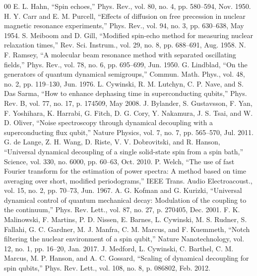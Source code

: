 \documentclass[conference]{IEEEtran}
\begin{document}
\begin{thebibliography}{00}
 E. L. Hahn, ``Spin echoes,'' Phys. Rev., vol. 80, no. 4,
pp. 580--594, Nov. 1950.
 H. Y. Carr and E. M. Purcell, ``Effects of diffusion on free
precession in nuclear magnetic resonance experiments,'' Phys. Rev., vol. 94,
no. 3, pp. 630--638, May 1954.
 S. Meiboom and D. Gill, ``Modified spin-echo method for measuring
nuclear relaxation times,'' Rev. Sci. Instrum., vol. 29, no. 8, pp. 688--691,
Aug. 1958.
 N. F. Ramsey, ``A molecular beam resonance method with separated
oscillating fields,'' Phys. Rev., vol. 78, no. 6, pp. 695--699, Jun. 1950.
 G. Lindblad, ``On the generators of quantum dynamical semigroups,''
Commun. Math. Phys., vol. 48, no. 2, pp. 119--130, Jun. 1976.
 L. Cywinski, R. M. Lutchyn, C. P. Nave, and S. Das Sarma, ``How to
enhance dephasing time in superconducting qubits,'' Phys. Rev. B, vol. 77,
no. 17, p. 174509, May 2008.
 J. Bylander, S. Gustavsson, F. Yan, F. Yoshihara, K. Harrabi,
G. Fitch, D. G. Cory, Y. Nakamura, J. S. Tsai, and W. D. Oliver, ``Noise
spectroscopy through dynamical decoupling with a superconducting flux qubit,''
Nature Physics, vol. 7, no. 7, pp. 565--570, Jul. 2011.
 G. de Lange, Z. H. Wang, D. Riste, V. V. Dobrovitski, and
R. Hanson, ``Universal dynamical decoupling of a single solid-state spin from a
spin bath,'' Science, vol. 330, no. 6000, pp. 60--63, Oct. 2010.
 P. Welch, ``The use of fast Fourier transform for the estimation of
power spectra: A method based on time averaging over short, modified
periodograms,'' IEEE Trans. Audio Electroacoust., vol. 15, no. 2, pp. 70--73,
Jun. 1967.
 A. G. Kofman and G. Kurizki, ``Universal dynamical control of
quantum mechanical decay: Modulation of the coupling to the continuum,'' Phys.
Rev. Lett., vol. 87, no. 27, p. 270405, Dec. 2001.
 F. K. Malinowski, F. Martins, P. D. Nissen, E. Barnes,
L. Cywinski, M. S. Rudner, S. Fallahi, G. C. Gardner, M. J. Manfra,
C. M. Marcus, and F. Kuemmeth, ``Notch filtering the nuclear environment of a
spin qubit,'' Nature Nanotechnology, vol. 12, no. 1, pp. 16--20, Jan. 2017.
 J. Medford, L. Cywinski, C. Barthel, C. M. Marcus, M. P. Hanson,
and A. C. Gossard, ``Scaling of dynamical decoupling for spin qubits,'' Phys.
Rev. Lett., vol. 108, no. 8, p. 086802, Feb. 2012.
\end{thebibliography}
\end{document}
